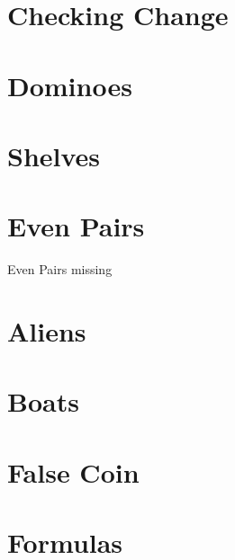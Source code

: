 \documentclass[a4paper, 10pt]{article}
\let\stdsection\section
\renewcommand\section{\newpage\stdsection}
\newcommand{\includecode}[1]{
    }
\begin{document}
    \begin{multicols}{2}
        \renewcommand{\cftsecleader}{\cftdotfill{\cftdotsep}}
        \renewcommand*\contentsname{Problems}
        \setcounter{tocdepth}{1}    %
        \tableofcontents
    \end{multicols}
    
    
    \section{Checking Change}
        \includecode{../problems/w01/Checking_Change/CheckingChange1.cpp}
    
    \section{Dominoes}
        \includecode{../problems/w01/Dominoes/Dominoes1.cpp}
    
    \section{Shelves}
        \includecode{../problems/w01/Shelves/Shelves1.cpp}
        
    \section{Even Pairs}
        Even Pairs missing
    
    
    \section{Aliens}
        \includecode{../problems/w02/Aliens/Aliens1.cpp}
        
    \section{Boats}
        \includecode{../problems/w02/Boats/Boats1.cpp}
        
    \section{False Coin}
        \includecode{../problems/w02/False_Coin/FalseCoin1.cpp}
        
    \section{Formulas}
        \includecode{../problems/w02/Formulas/Formulas1.cpp}
        
\end{document}
